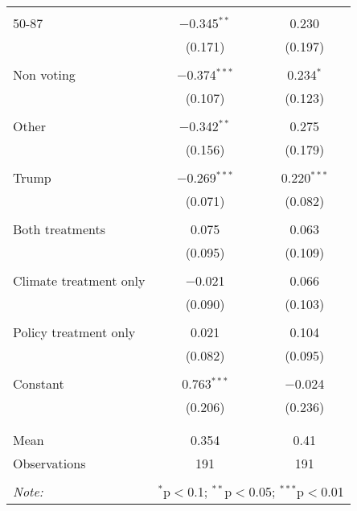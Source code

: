 \begin{tabular}{@{\extracolsep{5pt}}lcc}
  & & \\ 
 50-87 & $-$0.345$^{**}$ & 0.230 \\ 
  & (0.171) & (0.197) \\ 
  & & \\ 
 Non voting & $-$0.374$^{***}$ & 0.234$^{*}$ \\ 
  & (0.107) & (0.123) \\ 
  & & \\ 
 Other & $-$0.342$^{**}$ & 0.275 \\ 
  & (0.156) & (0.179) \\ 
  & & \\ 
 Trump & $-$0.269$^{***}$ & 0.220$^{***}$ \\ 
  & (0.071) & (0.082) \\ 
  & & \\ 
 Both treatments & 0.075 & 0.063 \\ 
  & (0.095) & (0.109) \\ 
  & & \\ 
 Climate treatment only & $-$0.021 & 0.066 \\ 
  & (0.090) & (0.103) \\ 
  & & \\ 
 Policy treatment only & 0.021 & 0.104 \\ 
  & (0.082) & (0.095) \\ 
  & & \\ 
 Constant & 0.763$^{***}$ & $-$0.024 \\ 
  & (0.206) & (0.236) \\ 
  & & \\ 
\hline \\[-1.8ex] 
Mean & 0.354 & 0.41 \\ 
Observations & 191 & 191 \\ 
\hline 
\hline \\[-1.8ex] 
\textit{Note:}  & \multicolumn{2}{r}{$^{*}$p$<$0.1; $^{**}$p$<$0.05; $^{***}$p$<$0.01} \\ 
\end{tabular} 
